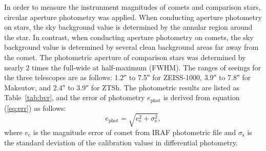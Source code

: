 In order to measure the  instrunment magnitudes of comets and comparison stars, circular aperture photometry was applied. When conducting aperture photometry on stars, the sky background value is determined by the annular region around the star. In contrast, when conducting aperture photometry on comets, the sky background value is determined by several clean background areas far away from the comet. The photometric aperture of comparison stars was determined by nearly \num{2} times the full-wide at half-maximum (FWHM). 
The ranges of seeings for the three telescopes are as follows: \ang{;;1.2} to \ang{;;7.5} for ZEISS-1000, \ang{;;3.9} to \ang{;;7.8} for Maksutov, and \ang{;;2.4} to \ang{;;3.9} for ZTSh. The photometric results are listed as Table~\ref{tab:bvr}, and the error of photometry $e_{\mathrm{phot}}$ is derived from equation (\ref{eq:err}) as follows: 
\begin{equation}
    e_{\mathrm{phot}} = \sqrt{e_{\mathrm{c}}^{2} + \sigma_\mathrm{s}^2}, 
    \label{eq:err}
\end{equation}
where $e_\mathrm{c}$ is the magnitude error of comet from IRAF photometric file and $\sigma_\mathrm{s}$ is the standard deviation of the calibration values in differential photometry. 






